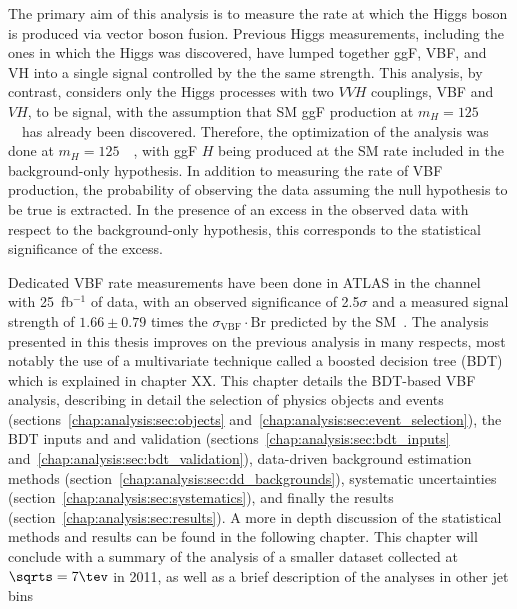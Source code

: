 
The primary aim of this analysis is to measure the rate at which the
Higgs boson is produced via vector boson fusion. Previous Higgs
measurements, including the ones in which the Higgs was discovered,
have lumped together ggF, VBF, and VH into a single signal controlled
by the the same strength. This analysis, by contrast, considers only the
Higgs processes with two $VVH$ couplings, VBF and $VH$, to be
signal, with the assumption that SM ggF production at
$m_H=125$~\gev~has already been discovered. Therefore, the
optimization of the analysis was done at $m_H=125$~\gev~, with ggF $H$
being produced at the SM rate included in the background-only hypothesis. In
addition to measuring the rate of VBF production, the probability of
observing the data assuming the null hypothesis to be true is
extracted. In the presence of an excess in the observed data with
respect to the background-only hypothesis, this
corresponds to the statistical significance of the excess.

Dedicated VBF rate measurements have been done in ATLAS in the \wwlnln
channel with 25~fb$^{-1}$ of data, with an observed significance of 2.5$\sigma$ and
a measured signal strength of $1.66\pm 0.79$ times the
$\sigma_{\mathrm{VBF}}\cdot{\mathrm{Br}}$ predicted by the
SM~\cite{bib:hww_moriond_2013}. The analysis presented in this thesis
improves on the previous analysis in
many respects, most notably the use of a multivariate technique called
a boosted decision tree (BDT) which is explained in chapter
XX. This chapter details the BDT-based VBF analysis, describing in
detail the selection of physics objects and events
(sections~\ref{chap:analysis:sec:objects} and~\ref{chap:analysis:sec:event_selection}), the
BDT inputs and and validation
(sections~\ref{chap:analysis:sec:bdt_inputs} and~\ref{chap:analysis:sec:bdt_validation}),
data-driven background estimation
methods (section~\ref{chap:analysis:sec:dd_backgrounds}), systematic
uncertainties (section~\ref{chap:analysis:sec:systematics}),
and finally the results (section~\ref{chap:analysis:sec:results}). A
more in depth discussion of the statistical methods and results can be
found in the following chapter. This chapter will conclude with a
summary of the analysis of a smaller dataset collected at $\sqrts =
7 \tev$ in 2011, as well as a brief description of the \hww analyses
in other jet bins
